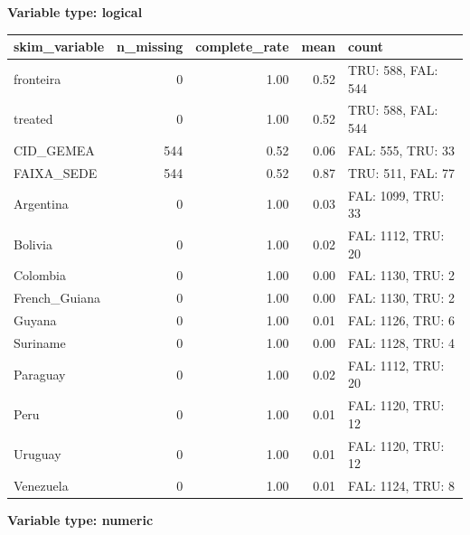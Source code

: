 \documentclass[
  letterpaper,
  DIV=11,
  numbers=noendperiod]{scrartcl}
\begin{document}
\textbf{Variable type: logical}

\begin{longtable}[]{@{}lrrrl@{}}
\toprule\noalign{}
skim\_variable & n\_missing & complete\_rate & mean & count \\
\midrule\noalign{}
\endhead
\bottomrule\noalign{}
\endlastfoot
fronteira & 0 & 1.00 & 0.52 & TRU: 588, FAL: 544 \\
treated & 0 & 1.00 & 0.52 & TRU: 588, FAL: 544 \\
CID\_GEMEA & 544 & 0.52 & 0.06 & FAL: 555, TRU: 33 \\
FAIXA\_SEDE & 544 & 0.52 & 0.87 & TRU: 511, FAL: 77 \\
Argentina & 0 & 1.00 & 0.03 & FAL: 1099, TRU: 33 \\
Bolivia & 0 & 1.00 & 0.02 & FAL: 1112, TRU: 20 \\
Colombia & 0 & 1.00 & 0.00 & FAL: 1130, TRU: 2 \\
French\_Guiana & 0 & 1.00 & 0.00 & FAL: 1130, TRU: 2 \\
Guyana & 0 & 1.00 & 0.01 & FAL: 1126, TRU: 6 \\
Suriname & 0 & 1.00 & 0.00 & FAL: 1128, TRU: 4 \\
Paraguay & 0 & 1.00 & 0.02 & FAL: 1112, TRU: 20 \\
Peru & 0 & 1.00 & 0.01 & FAL: 1120, TRU: 12 \\
Uruguay & 0 & 1.00 & 0.01 & FAL: 1120, TRU: 12 \\
Venezuela & 0 & 1.00 & 0.01 & FAL: 1124, TRU: 8 \\
\end{longtable}

\textbf{Variable type: numeric}
\end{document}

